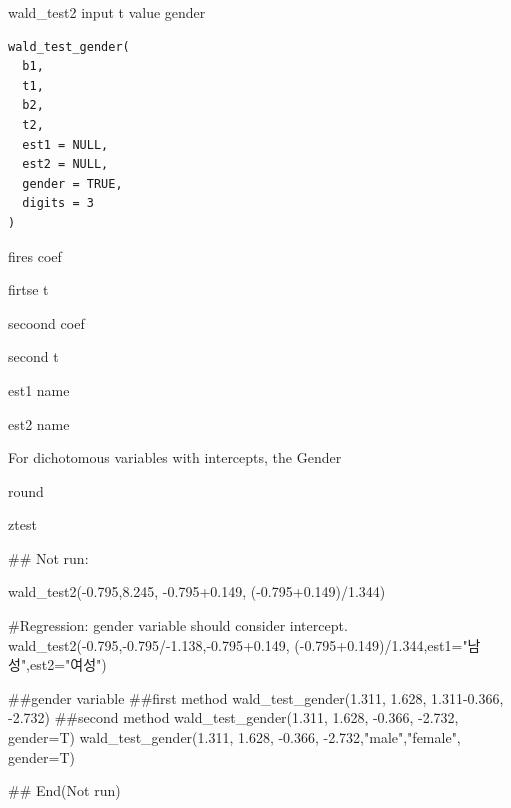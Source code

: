 \documentclass[a4paper]{book}
\begin{document}
%
\begin{Description}
wald\_test2 input t value gender
\end{Description}
%
\begin{Usage}
\begin{verbatim}
wald_test_gender(
  b1,
  t1,
  b2,
  t2,
  est1 = NULL,
  est2 = NULL,
  gender = TRUE,
  digits = 3
)
\end{verbatim}
\end{Usage}
%
\begin{Arguments}
\begin{ldescription}
\item[\code{b1}] fires coef

\item[\code{t1}] firtse t

\item[\code{b2}] secoond coef

\item[\code{t2}] second t

\item[\code{est1}] est1 name

\item[\code{est2}] est2 name

\item[\code{gender}] For dichotomous variables with intercepts, the Gender

\item[\code{digits}] round
\end{ldescription}
\end{Arguments}
%
\begin{Value}
ztest
\end{Value}
%
\begin{Examples}
\begin{ExampleCode}
\#\# Not run: 

wald_test2(-0.795,8.245, -0.795+0.149,  (-0.795+0.149)/1.344)

#Regression: gender variable should consider intercept.
wald_test2(-0.795,-0.795/-1.138,-0.795+0.149,
           (-0.795+0.149)/1.344,est1="남성",est2="여성")


##gender variable
##first method
wald_test_gender(1.311, 1.628, 1.311-0.366,  -2.732)
##second method
wald_test_gender(1.311, 1.628, -0.366,  -2.732, gender=T)
wald_test_gender(1.311, 1.628, -0.366,  -2.732,"male","female", gender=T)


## End(Not run)



\end{ExampleCode}
\end{Examples}
\end{document}
